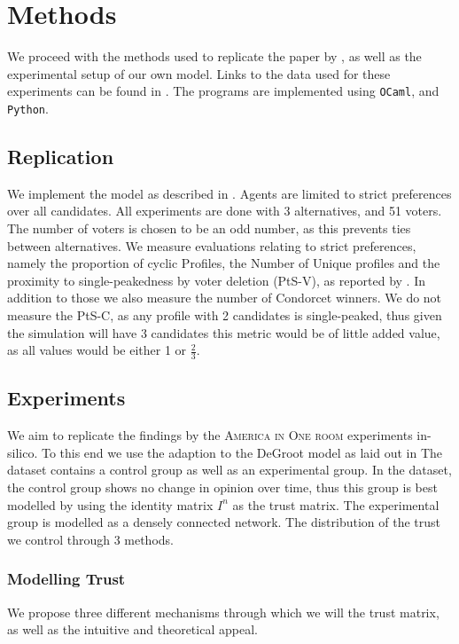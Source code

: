 \chapter{Methods}
\label{Methods}

We proceed with the methods used to replicate the paper by
\citet{radDeliberationSinglePeakednessCoherent2021}, as well as the
experimental setup of our own model. Links to the data used for these
experiments can be found in . The programs
are implemented using \texttt{OCaml}, and \texttt{Python}.


\section{Replication} We implement the model as described in
. Agents are limited to strict preferences over all
candidates. All experiments are done with 3 alternatives, and 51 voters. The
number of voters is chosen to be an odd number, as this prevents ties between
alternatives. We measure evaluations relating to strict preferences, namely the
proportion of cyclic Profiles, the Number of Unique profiles and the proximity
to single-peakedness by voter deletion (PtS-V), as reported by
\citet{radDeliberationSinglePeakednessCoherent2021}. In addition to those we
also measure the number of Condorcet winners. We do not measure the PtS-C, as
any profile with 2 candidates is single-peaked, thus given the simulation will have 3 candidates
this metric would be of little added value, as all values would be either 1 or $\frac{2}{3}$.

\section{Experiments}

We aim to replicate the findings by the \textsc{America in One room}
experiments \cite{fishkinCanDeliberationHave2024} in-silico. To this end we
use the adaption to the DeGroot model as laid out in 
The dataset contains a control group as well as an experimental group. In the
dataset, the control group shows no change in opinion over time,
thus this group is best modelled by using the identity matrix $I^n$ as the
trust matrix. The experimental group is modelled as a densely connected
network.  The distribution of the trust we control through 3 methods.

\subsection{Modelling Trust} We propose three different mechanisms through which we
will the trust matrix, as well as the intuitive and theoretical
appeal.

